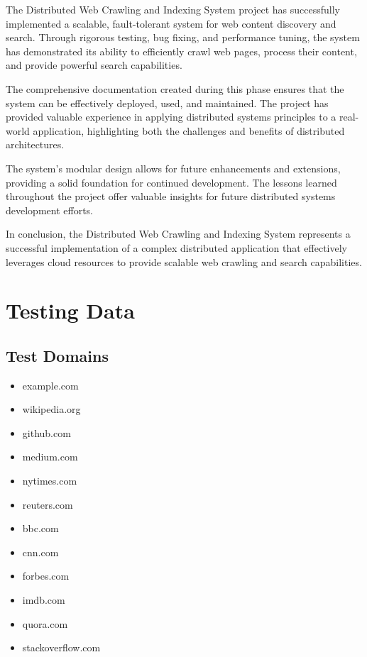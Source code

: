 \documentclass[12pt,a4paper]{report}
\begin{document}
The Distributed Web Crawling and Indexing System project has successfully implemented a scalable, fault-tolerant system for web content discovery and search. Through rigorous testing, bug fixing, and performance tuning, the system has demonstrated its ability to efficiently crawl web pages, process their content, and provide powerful search capabilities.

The comprehensive documentation created during this phase ensures that the system can be effectively deployed, used, and maintained. The project has provided valuable experience in applying distributed systems principles to a real-world application, highlighting both the challenges and benefits of distributed architectures.

The system's modular design allows for future enhancements and extensions, providing a solid foundation for continued development. The lessons learned throughout the project offer valuable insights for future distributed systems development efforts.

In conclusion, the Distributed Web Crawling and Indexing System represents a successful implementation of a complex distributed application that effectively leverages cloud resources to provide scalable web crawling and search capabilities.

\appendix

\chapter{Testing Data}

\section{Test Domains}
\begin{itemize}
\item example.com
\item wikipedia.org
\item github.com
\item medium.com
\item nytimes.com
\item reuters.com
\item bbc.com
\item cnn.com
\item forbes.com
\item imdb.com
\item quora.com
\item stackoverflow.com
\end{itemize}
\end{document}
